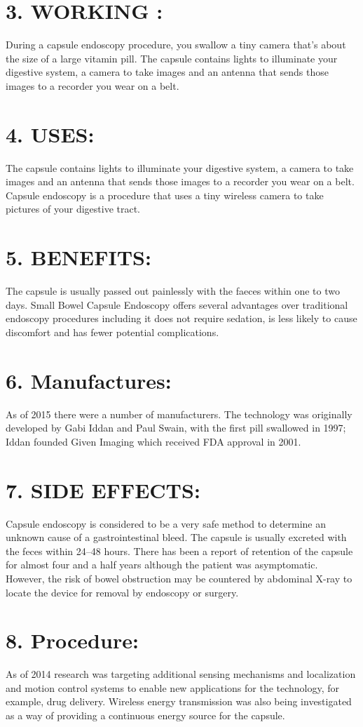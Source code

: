\documentclass[12pt]{article}
\begin{document}
\section*{3.  WORKING :}
During a capsule endoscopy procedure, you swallow a tiny camera that's about the size of a large vitamin pill. The capsule contains lights to illuminate your digestive system, a camera to take images and an antenna that sends those images to a recorder you wear on a belt.

\section*{4.  USES:}
 The capsule contains lights to illuminate your digestive system, a camera to take images and an antenna that sends those images to a recorder you wear on a belt. Capsule endoscopy is a procedure that uses a tiny wireless camera to take pictures of your digestive tract.
 
 \section*{5.  BENEFITS:}
 The capsule is usually passed out painlessly with the faeces within one to two days. Small Bowel Capsule Endoscopy offers several advantages over traditional endoscopy procedures including it does not require sedation, is less likely to cause discomfort and has fewer potential complications. 
 
 \section*{6.  Manufactures:}
 As of 2015 there were a number of manufacturers. The technology was originally developed by Gabi Iddan and Paul Swain, with the first pill swallowed in 1997; Iddan founded Given Imaging which received FDA approval in 2001.
 
 \section*{7. SIDE EFFECTS: }
 Capsule endoscopy is considered to be a very safe method to determine an unknown cause of a gastrointestinal bleed. The capsule is usually excreted with the feces within 24–48 hours. There has been a report of retention of the capsule for almost four and a half years although the patient was asymptomatic. However, the risk of bowel obstruction may be countered by abdominal X-ray to locate the device for removal by endoscopy or surgery.
 
\section*{8. Procedure:}
As of 2014 research was targeting additional sensing mechanisms and localization and motion control systems to enable new applications for the technology, for example, drug delivery. Wireless energy transmission was also being investigated as a way of providing a continuous energy source for the capsule.
   
 

 
 
 
\end{document}
